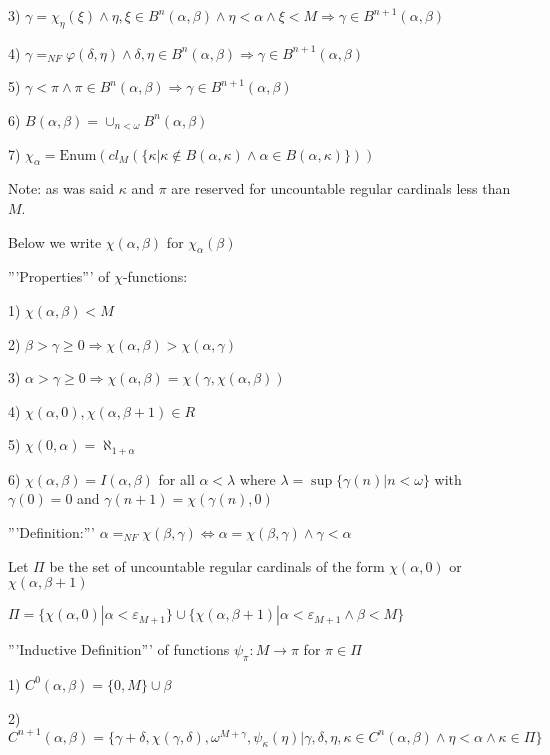 \documentclass[10pt]{article}
\begin{document}
3) \(\gamma=\chi_\eta(\xi)\wedge\eta,\xi\in B^n(\alpha, \beta)\wedge\eta<\alpha\wedge\xi<M\Rightarrow\gamma\in B^{n+1}(\alpha, \beta)\)

4) \(\gamma=_{NF}\varphi(\delta,\eta) \wedge\delta,\eta\in B^n(\alpha, \beta)\Rightarrow\gamma\in B^{n+1}(\alpha, \beta)\)

5) \(\gamma<\pi\wedge\pi\in B^n(\alpha, \beta)\Rightarrow\gamma\in B^{n+1}(\alpha, \beta)\)

6) \(B(\alpha,\beta)=\cup_{n<\omega}B^{n}(\alpha, \beta)\)

7) \(\chi_\alpha=\text{Enum}(cl_M(\{\kappa|\kappa\notin B(\alpha,\kappa)\wedge\alpha\in B(\alpha,\kappa)\}))\)

Note: as was said \(\kappa\) and \(\pi \) are reserved for uncountable regular cardinals less than \(M\). 

Below we write \(\chi(\alpha,\beta)\) for \(\chi_\alpha(\beta)\)

'''Properties''' of  \(\chi\)-functions:

1) \(\chi(\alpha,\beta)<M\)

2) \(\beta>\gamma\geq 0 \Rightarrow \chi(\alpha,\beta)>\chi(\alpha,\gamma)\) 

3) \(\alpha>\gamma\geq 0 \Rightarrow \chi(\alpha,\beta)=\chi(\gamma,\chi(\alpha,\beta))\)

4) \(\chi(\alpha,0),\chi(\alpha,\beta+1) \in R\)

5) \(\chi(0,\alpha)=\aleph_{1+\alpha}\)

6) \(\chi(\alpha,\beta)=I(\alpha,\beta)\) for all \(\alpha<\lambda\) where \(\lambda=\sup\{\gamma(n)|n<\omega\}\) with \(\gamma(0)=0\) and \(\gamma(n+1)=\chi(\gamma(n),0)\)

'''Definition:''' \(\alpha=_{NF}\chi(\beta,\gamma) \Leftrightarrow\alpha=\chi(\beta,\gamma)\wedge\gamma<\alpha\)


Let \(\Pi\)  be the set of uncountable regular cardinals of the form \(\chi(\alpha,0)\) or \(\chi(\alpha,\beta+1)\) 

\(\Pi=\{\chi(\alpha,0)|\alpha<\varepsilon_{M+1}\}\cup\{\chi(\alpha,\beta+1)|\alpha<\varepsilon_{M+1}\wedge\beta<M\}\)

'''Inductive Definition''' of  functions \(\psi_\pi: M\rightarrow \pi\) for \(\pi\in \Pi\) 

1) \(C^0(\alpha, \beta)=\{0,M\}\cup\beta\)

2) \(C^{n+1}(\alpha, \beta)=\{\gamma+\delta,\chi(\gamma,\delta), \omega^{M+\gamma}, \psi_\kappa(\eta)|\gamma,\delta,\eta,\kappa\in C^{n}(\alpha, \beta)\wedge\eta<\alpha\wedge\kappa\in\Pi\}\)
\end{document}

